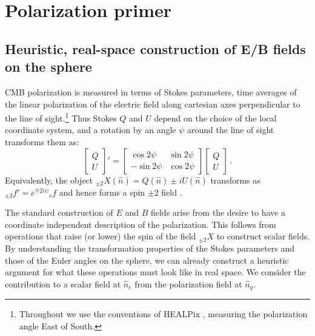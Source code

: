 \documentclass[a4paper,11pt]{article}
\newcommand{\beq}{\begin{equation}}
\newcommand{\eeq}{\end{equation}}
\newcommand{\fqu}{\begin{bmatrix} Q \\ U \end{bmatrix}}
\begin{document}
\section{Polarization primer} \label{sec:pol-primer}
\subsection{Heuristic, real-space construction of E/B fields on the sphere} \label{sec:qu2eb_heuristic}

CMB polarization is measured in terms of Stokes parameters, time averages of the linear polarization of the electric field along cartesian axes perpendicular to the line of sight.\footnote{Throughout we use the conventions of HEALPix \cite{healpix_primer}, measuring the polarization angle East of South.} Thus Stokes $Q$ and $U$ depend on the choice of the local coordinate system, and a rotation by an angle $\psi$ around the line of sight transforms them as:
%
\beq \label{eq:qu-rot}
\fqu' = \begin{bmatrix} \cos{2 \psi} &  \sin{2 \psi} \\ -\sin{2\psi} & \cos{2 \psi} \end{bmatrix} \fqu \,.
\eeq
Equivalently, the object $_{\pm 2}{X}(\hat{n}) = Q(\hat{n}) \pm i U (\hat{n})$ transforms as ${}_{\pm 2}f' = e^{\mp 2i\psi} {}_{s}f$ and hence forms a spin $\pm$2 field \cite{Zaldarriaga1997}.

The standard construction of $E$ and $B$ fields arise from the desire to have a coordinate independent description of the polarization. This follows from operations that raise (or lower) the spin of the field ${}_{\pm2}{X}$ to construct scalar fields.  By understanding the transformation properties of the Stokes parameters and those of the Euler angles on the sphere, we can already construct a heuristic argument for what these operations must look like in real space. We consider the contribution to a scalar field at $\hat n_e$ from the polarization field at $\hat n_q$. 
\end{document}
